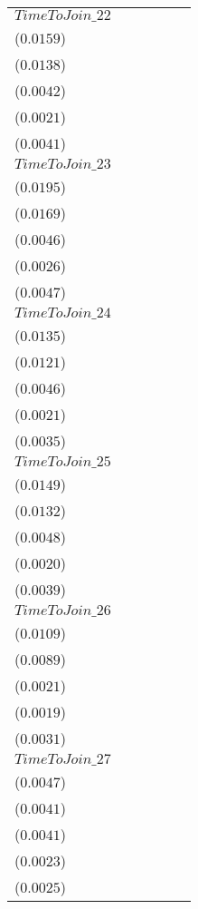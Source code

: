 \begin{tabular}{llllll}
$TimeToJoin\_22$  &     \makecell{$0.0088^{}$ \\ ($0.0159$)} &     \makecell{$0.0062^{}$ \\ ($0.0138$)} &  \makecell{$-0.0189^{***}$ \\ ($0.0042$)} &  \makecell{$-0.0131^{***}$ \\ ($0.0021$)} &     \makecell{$0.0045^{}$ \\ ($0.0041$)} \\
$TimeToJoin\_23$  &     \makecell{$0.0129^{}$ \\ ($0.0195$)} &     \makecell{$0.0098^{}$ \\ ($0.0169$)} &  \makecell{$-0.0161^{***}$ \\ ($0.0046$)} &  \makecell{$-0.0131^{***}$ \\ ($0.0026$)} &     \makecell{$0.0060^{}$ \\ ($0.0047$)} \\
$TimeToJoin\_24$  &     \makecell{$0.0129^{}$ \\ ($0.0135$)} &     \makecell{$0.0085^{}$ \\ ($0.0121$)} &  \makecell{$-0.0162^{***}$ \\ ($0.0046$)} &  \makecell{$-0.0135^{***}$ \\ ($0.0021$)} &   \makecell{$0.0073^{**}$ \\ ($0.0035$)} \\
$TimeToJoin\_25$  &     \makecell{$0.0140^{}$ \\ ($0.0149$)} &     \makecell{$0.0103^{}$ \\ ($0.0132$)} &  \makecell{$-0.0157^{***}$ \\ ($0.0048$)} &  \makecell{$-0.0125^{***}$ \\ ($0.0020$)} &    \makecell{$0.0068^{*}$ \\ ($0.0039$)} \\
$TimeToJoin\_26$  &     \makecell{$0.0058^{}$ \\ ($0.0109$)} &     \makecell{$0.0031^{}$ \\ ($0.0089$)} &  \makecell{$-0.0172^{***}$ \\ ($0.0021$)} &  \makecell{$-0.0128^{***}$ \\ ($0.0019$)} &    \makecell{$0.0058^{*}$ \\ ($0.0031$)} \\
$TimeToJoin\_27$  &   \makecell{$0.0095^{**}$ \\ ($0.0047$)} &    \makecell{$0.0071^{*}$ \\ ($0.0041$)} &  \makecell{$-0.0158^{***}$ \\ ($0.0041$)} &  \makecell{$-0.0113^{***}$ \\ ($0.0023$)} &     \makecell{$0.0038^{}$ \\ ($0.0025$)} \\

\end{tabular}
